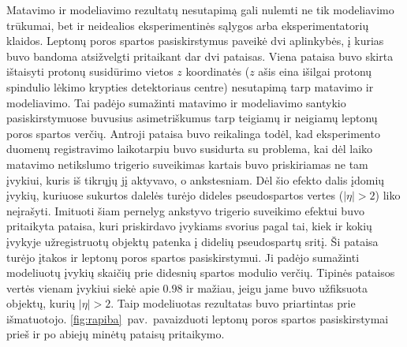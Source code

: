 \documentclass[a4paper, 12pt, oneside]{article}
\begin{document}
Matavimo ir modeliavimo rezultatų nesutapimą gali nulemti ne tik modeliavimo trūkumai, bet ir neidealios eksperimentinės sąlygos
arba eksperimentatorių klaidos.
Leptonų poros spartos pasiskirstymus paveikė dvi aplinkybės, į kurias buvo bandoma atsižvelgti pritaikant dar dvi pataisas.
Viena pataisa buvo skirta ištaisyti protonų susidūrimo vietos $z$ koordinatės ($z$ ašis eina išilgai protonų
spindulio lėkimo krypties detektoriaus centre) nesutapimą tarp matavimo ir modeliavimo.
Tai padėjo sumažinti matavimo ir modeliavimo santykio pasiskirstymuose buvusius asimetriškumus tarp teigiamų ir neigiamų leptonų
poros spartos verčių.
Antroji pataisa buvo reikalinga todėl, kad eksperimento duomenų registravimo laikotarpiu buvo susidurta su problema,
kai dėl laiko matavimo netikslumo trigerio suveikimas kartais buvo priskiriamas ne tam įvykiui, kuris iš tikrųjų jį aktyvavo, o
ankstesniam.
Dėl šio efekto dalis įdomių įvykių, kuriuose sukurtos dalelės turėjo dideles pseudospartos vertes ($|\eta|>2$) liko neįrašyti.
Imituoti šiam pernelyg ankstyvo trigerio suveikimo efektui buvo pritaikyta pataisa, kuri priskirdavo įvykiams
svorius pagal tai, kiek ir kokių įvykyje užregistruotų objektų patenka į didelių pseudospartų sritį.
Ši pataisa turėjo įtakos ir leptonų poros spartos pasiskirstymui.
Ji padėjo sumažinti modeliuotų įvykių skaičių prie didesnių spartos modulio verčių.
Tipinės pataisos vertės vienam įvykiui siekė apie $0.98$ ir mažiau, jeigu jame buvo užfiksuota objektų, kurių $|\eta|>2$.
Taip modeliuotas rezultatas buvo priartintas prie išmatuotojo.
\ref{fig:rapiba}~pav.\ pavaizduoti leptonų poros spartos pasiskirstymai prieš ir po abiejų minėtų pataisų pritaikymo.
\end{document}
